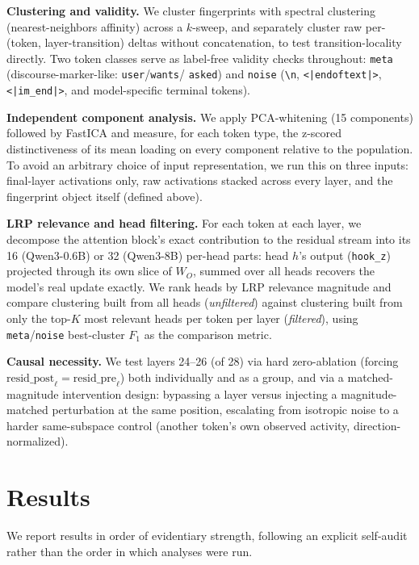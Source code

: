 \documentclass{article}
\theoremstyle{plain}
\theoremstyle{definition}
\theoremstyle{remark}
\begin{document}
\textbf{Clustering and validity.} We cluster fingerprints with spectral clustering
\citep{ng2001spectral} (nearest-neighbors affinity) across a $k$-sweep, and separately
cluster raw per-(token, layer-transition) deltas without concatenation, to test
transition-locality directly. Two token classes serve as label-free validity checks
throughout: \texttt{meta} (discourse-marker-like: \texttt{user}/\texttt{wants}/
\texttt{asked}) and \texttt{noise} (\texttt{\textbackslash n}, \texttt{<|endoftext|>},
\texttt{<|im\_end|>}, and model-specific terminal tokens).

\textbf{Independent component analysis.} We apply PCA-whitening (15 components)
followed by FastICA \citep{hyvarinen2000ica} and measure, for each token type, the
z-scored distinctiveness of its mean loading on every component relative to the
population. To avoid an arbitrary choice of input representation, we run this on three
inputs: final-layer activations only, raw activations stacked across every layer, and
the fingerprint object itself (defined above).

\textbf{LRP relevance and head filtering.} For each token at each layer, we decompose
the attention block's exact contribution to the residual stream into its 16 (Qwen3-0.6B)
or 32 (Qwen3-8B) per-head parts: head $h$'s output (\texttt{hook\_z}) projected through
its own slice of $W_O$, summed over all heads recovers the model's real update exactly.
We rank heads by LRP relevance magnitude and compare clustering built from all heads
(\emph{unfiltered}) against clustering built from only the top-$K$ most relevant heads
per token per layer (\emph{filtered}), using \texttt{meta}/\texttt{noise} best-cluster
$F_1$ as the comparison metric.

\textbf{Causal necessity.} We test layers 24--26 (of 28) via hard zero-ablation
(forcing $\text{resid\_post}_\ell = \text{resid\_pre}_\ell$) both individually and as a
group, and via a matched-magnitude intervention design: bypassing a layer versus
injecting a magnitude-matched perturbation at the same position, escalating from
isotropic noise to a harder same-subspace control (another token's own observed
activity, direction-normalized).

\section{Results}
\label{sec:results}

We report results in order of evidentiary strength, following an explicit self-audit
rather than the order in which analyses were run.
\end{document}
